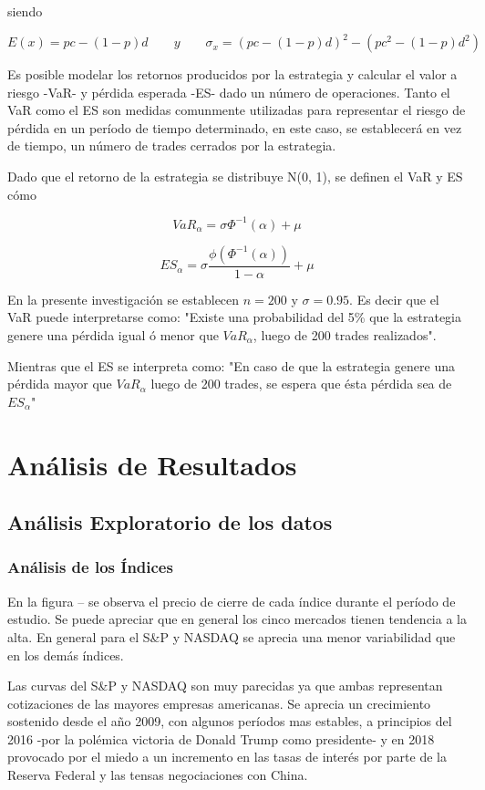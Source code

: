 \documentclass[a4paper,12pt]{Latex/Classes/PhDthesisPSnPDF}
\begin{document}
siendo

$$ E(x) = pc - (1-p)d \qquad y \qquad \sigma_{x} = (pc - (1-p)d)^{2} - (pc^{2} - (1-p)d^{2}) $$

Es posible modelar los retornos producidos por la estrategia y calcular el valor a riesgo -VaR- y pérdida esperada -ES- dado un número de operaciones. Tanto el VaR como el ES son medidas comunmente utilizadas para representar el riesgo de pérdida en un período de tiempo determinado, en este caso, se establecerá en vez de tiempo, un número de trades cerrados por la estrategia.

Dado que el retorno de la estrategia se distribuye N(0, 1), se definen el VaR y ES cómo

$$ VaR_{\alpha} = \sigma \Phi^{-1}(\alpha) + \mu $$

$$ ES_{\alpha} = \sigma \frac{\phi(\Phi^{-1}(\alpha))}{1-\alpha} + \mu $$

En la presente investigación se establecen $n = 200$ y $\sigma = 0.95$. Es decir que el VaR puede interpretarse como: "Existe una probabilidad del 5\% que la estrategia genere una pérdida igual ó menor que $VaR_{\alpha}$, luego de 200 trades realizados".

Mientras que el ES se interpreta como: "En caso de que la estrategia genere una pérdida mayor que $VaR_{\alpha}$ luego de 200 trades, se espera que ésta pérdida sea de $ES_{\alpha}$"

\chapter{Análisis de Resultados}

\section{Análisis Exploratorio de los datos}

\subsection{Análisis de los Índices}

En la figura -- se observa el precio de cierre de cada índice durante el período de estudio. Se puede apreciar que en general los cinco mercados tienen tendencia a la alta. En general para el S\&P y NASDAQ se aprecia una menor variabilidad que en los demás índices.

Las curvas del S\&P y NASDAQ son muy parecidas ya que ambas representan cotizaciones de las mayores empresas americanas. Se aprecia un crecimiento sostenido desde el año 2009, con algunos períodos mas estables, a principios del 2016 -por la polémica victoria de Donald Trump como presidente- y en 2018 provocado por el miedo a un incremento en las tasas de interés por parte de la Reserva Federal y las tensas negociaciones con China.
\end{document}

